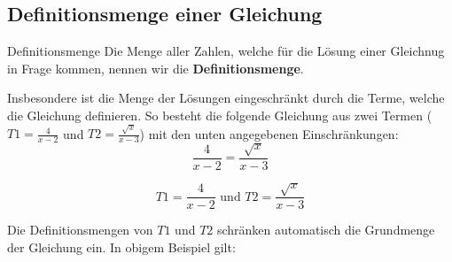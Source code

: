 
  
  \subsection{Definitionsmenge einer
    Gleichung}
\begin{definition}{Definitionsmenge}{}  Die Menge aller Zahlen, welche für die Lösung einer Gleichnug in Frage kommen,
  nennen wir die \textbf{Definitionsmenge}.
\end{definition}


  Insbesondere ist die Menge der Lösungen eingeschränkt durch
  die Terme, welche die Gleichung definieren. So besteht die folgende
  Gleichung aus zwei Termen ($T1=\frac{4}{x-2}$ und $T2=\frac{\sqrt{x}}{x-3}$) mit den unten angegebenen
  Einschränkungen:
  $$\frac{4}{x-2}=\frac{\sqrt{x}}{x-3}$$

$$T1=\frac{4}{x-2} \text{ und } T2=\frac{\sqrt{x}}{x-3}$$
  
  Die Definitionsmengen von $T1$ und $T2$ schränken automatisch die
  Grundmenge der Gleichung ein. In obigem Beispiel gilt:
  
